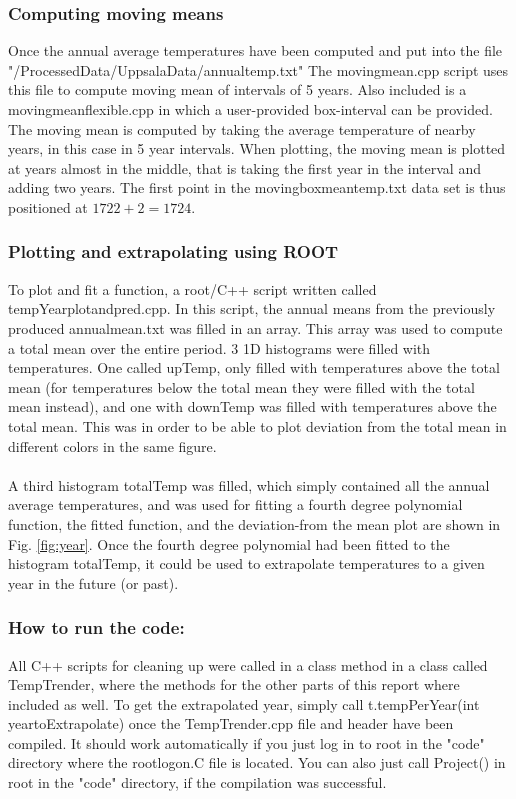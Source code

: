 \documentclass[a4paper]{article}
\begin{document}
\subsubsection{Computing moving means}
Once the annual average temperatures have been computed and put into the file "/ProcessedData/UppsalaData/annualtemp.txt" The movingmean.cpp script uses this file to compute moving mean of intervals of 5 years. Also included is a movingmeanflexible.cpp in which a user-provided box-interval can be provided. The moving mean is computed by taking the average temperature of nearby years, in this case in 5 year intervals. When plotting, the moving mean is plotted at years almost in the middle, that is taking the first year in the interval and adding two years. The first point in the movingboxmeantemp.txt data set is thus positioned at $1722 + 2 = 1724$.
\subsubsection{Plotting and extrapolating using ROOT}
To plot and fit a function, a root/C++ script written called tempYearplotandpred.cpp. In this script, the annual means from the previously produced annualmean.txt was filled in an array. This array was used to compute a total mean over the entire period. 3 1D histograms were filled with
temperatures. One called upTemp, only filled with temperatures above the total mean (for temperatures below the total mean they were filled with the total mean instead), and one with downTemp was filled with temperatures above the total mean. This was in order to be able to plot deviation from the total mean in different colors in the same figure.\\\\

A third histogram totalTemp was filled, which simply contained all the annual average temperatures, and was used for fitting a fourth degree polynomial function, the fitted function, and the deviation-from the mean plot are shown in Fig. \ref{fig:year}. Once the fourth degree polynomial had been fitted to the histogram totalTemp, it could be used to extrapolate temperatures to a given year in the future (or past).

\subsubsection{How to run the code:}
All C++ scripts for cleaning up were called in a class method in a class called TempTrender, where the methods for the other parts of this report where included as well. To get the extrapolated year, simply call t.tempPerYear(int yeartoExtrapolate) once the TempTrender.cpp file and header have been compiled. It should work automatically if you just log in to root in the "code" directory where the rootlogon.C file is located. You can also just call Project() in root in the "code" directory, if the compilation was successful. 
\end{document}
